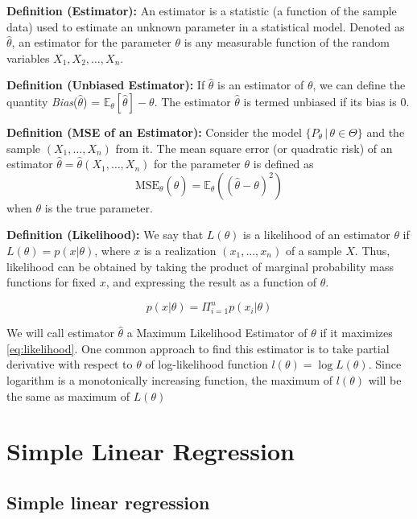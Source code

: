 \documentclass[12pt,a4paper,oneside]{book} %
\begin{document}
\textbf{Definition (Estimator):} An estimator is a statistic (a function of the sample data) used to estimate an unknown parameter in a statistical model. Denoted as $\hat{\theta}$, an estimator for the parameter $\theta$ is any measurable function of the random variables $X_1, X_2, \ldots, X_n$.

\textbf{Definition (Unbiased Estimator):} If $\hat{\theta}$ is an estimator of $\theta$, we can define the quantity \textit{Bias}($\hat{\theta}$) = $\mathbb{E}_{\theta}[\hat{\theta}] - \theta$. The estimator $\hat{\theta}$ is termed unbiased if its bias is 0.

\textbf{Definition (MSE of an Estimator):} Consider the model $\{P_{\theta} \,|\, \theta \in \Theta\}$ and the sample $(X_1, \ldots, X_n)$ from it. The mean square error (or quadratic risk) of an estimator $\hat{\theta} = \hat{\theta}(X_1, \ldots, X_n)$ for the parameter $\theta$ is defined as
\[ \text{MSE}_{\theta}(\hat{\theta}) = \mathbb{E}_{\theta}((\hat{\theta} - \theta)^2) \]
when $\theta$ is the true parameter.

\textbf{Definition (Likelihood):} We say that $L(\theta)$ is a likelihood of an estimator $\theta$ if $L(\theta)=p(x|\theta)$, where $x$ is a realization $(x_1,...,x_n)$ of a sample $X$. Thus, likelihood can be obtained by taking the product of marginal probability mass functions for fixed $x$, and expressing the result as a function of $\theta$.

\begin{equation} \label{eq:likelihood}
	p(x|\theta) = \Pi^n_{i=1} p(x_i| \theta)
\end{equation}


We will call estimator $\hat{\theta}$ a Maximum Likelihood Estimator of $\theta$ if it maximizes \ref{eq:likelihood}. One common approach to find this estimator is to take partial derivative with respect to $\theta$ of log-likelihood function $l(\theta)=\log L(\theta)$. Since logarithm is a monotonically increasing function, the maximum of $l(\theta)$ will be the same as maximum of $L(\theta)$



	\chapter{Simple Linear Regression}
	
	
\section{Simple linear regression}
\end{document}

